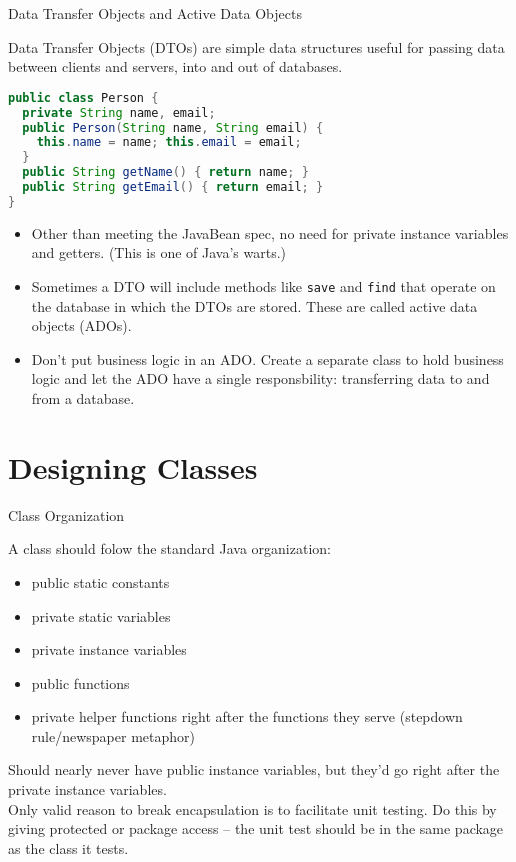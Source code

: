\documentclass{beamer}
\begin{document}
\begin{frame}[fragile]{Data Transfer Objects and Active Data Objects}


Data Transfer Objects (DTOs) are simple data structures useful for passing data between clients and servers, into and out of databases.
\begin{lstlisting}[language=Java]
public class Person {
  private String name, email;
  public Person(String name, String email) {
    this.name = name; this.email = email;
  }
  public String getName() { return name; }
  public String getEmail() { return email; }
}
\end{lstlisting}
\vspace{-.1in}
\begin{itemize}
\item Other than meeting the JavaBean spec, no need for private instance variables and getters.  (This is one of Java's warts.)
\item Sometimes a DTO will include methods like {\tt save} and {\tt find} that operate on the database in which the DTOs are stored.  These are called active data objects (ADOs).
\item Don't put business logic in an ADO.  Create a separate class to hold business logic and let the ADO have a single responsbility: transferring data to and from a database.
\end{itemize}


\end{frame}

\section{Designing Classes}

\begin{frame}[fragile]{Class Organization}


A class should folow the standard Java organization:

\begin{itemize}
\item public static constants
\item private static variables
\item private instance variables
\item public functions
\item private helper functions right after the functions they serve (stepdown rule/newspaper metaphor)
\end{itemize}
Should nearly never have public instance variables, but they'd go right after the private instance variables.\\
\vspace{.1in}
Only valid reason to break encapsulation is to facilitate unit testing.  Do this by giving protected or package access -- the unit test should be in the same package as the class it tests.


\end{frame}
\end{document}
